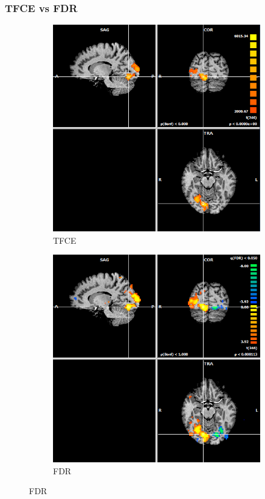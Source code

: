 \documentclass{beamer}
\begin{document}
\begin{frame}
\frametitle{TFCE vs FDR}
\begin{figure}
    \centering
    \begin{subfigure}[b]{0.48\textwidth}
        \includegraphics[width=\textwidth]{Images/Brainvoyager-TFCE83187129.png}
	\caption{TFCE}
    \end{subfigure}
    \begin{subfigure}[b]{0.48\textwidth}
        \includegraphics[width=\textwidth]{Images/Brainvoyager-FDR83187129.png}
	\caption{FDR}
    \end{subfigure}
\end{figure}
\end{frame}
\end{document}
